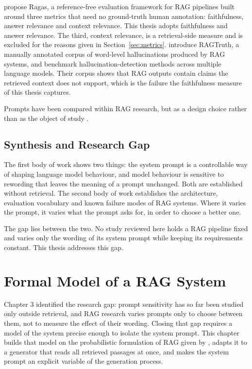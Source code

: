 \documentclass[12pt,a4paper,oneside]{scrreprt}
\begin{document}
\citet{es2023ragas} propose Ragas, a reference-free evaluation framework for RAG
pipelines built around three metrics that need no ground-truth human annotation:
faithfulness, answer relevance and context relevance. This thesis adopts faithfulness and answer relevance. The third, context
relevance, is a retrieval-side measure and is excluded for the reasons given in
Section~\ref{sec:metrics}. \citet{niu2024ragtruth} introduce RAGTruth, a manually annotated corpus of
word-level hallucinations produced by RAG systems, and benchmark
hallucination-detection methods across multiple language models. Their corpus
shows that RAG outputs contain claims the retrieved context does not support,
which is the failure the faithfulness measure of this thesis captures.

Prompts have been compared within RAG research, but as a design choice rather
than as the object of study \citet{mao2024fitrag}.

\section{Synthesis and Research Gap}

The first body of work shows two things: the system prompt is a controllable way of shaping language model behaviour, and model behaviour is sensitive to rewording that leaves the meaning of a prompt unchanged. Both are established without retrieval. The second body of work establishes the architecture, evaluation vocabulary and known failure modes of RAG systems. Where it varies the prompt, it varies what the prompt asks for, in order to choose a better one.

The gap lies between the two. No study reviewed here holds a RAG pipeline fixed and varies only the wording of its system prompt while keeping its requirements constant. This thesis addresses this gap.

\chapter{Formal Model of a RAG System}

Chapter 3 identified the research gap: prompt sensitivity has so far been studied only outside retrieval, and RAG research varies prompts only to choose between them, not to measure the effect of their wording. Closing that gap requires a model of the system precise enough to isolate the system prompt. This chapter builds that model on the probabilistic formulation of RAG given by \citet{lewis2020rag}, adapts it to a generator that reads all retrieved passages at once, and makes the system prompt an explicit variable of the generation process.
\end{document}
